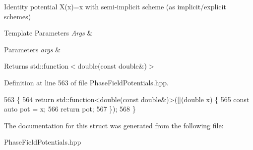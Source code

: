 Identity potential X(x)=x with semi-\/implicit scheme (as implicit/explicit schemes) 


\begin{DoxyTemplParams}{Template Parameters}
{\em Args} & \\
\hline
\end{DoxyTemplParams}

\begin{DoxyParams}{Parameters}
{\em args} & \\
\hline
\end{DoxyParams}
\begin{DoxyReturn}{Returns}
std\+::function$<$double(const double\&)$>$ 
\end{DoxyReturn}


Definition at line 563 of file Phase\+Field\+Potentials.\+hpp.


\begin{DoxyCode}
563                                                         \{
564     \textcolor{keywordflow}{return} std::function<double(const double&)>([](\textcolor{keywordtype}{double} x) \{
565       \textcolor{keyword}{const} \textcolor{keyword}{auto} pot = x;
566       \textcolor{keywordflow}{return} pot;
567     \});
568   \}
\end{DoxyCode}


The documentation for this struct was generated from the following file\+:\begin{DoxyCompactItemize}
\item 
Phase\+Field\+Potentials.\+hpp\end{DoxyCompactItemize}
